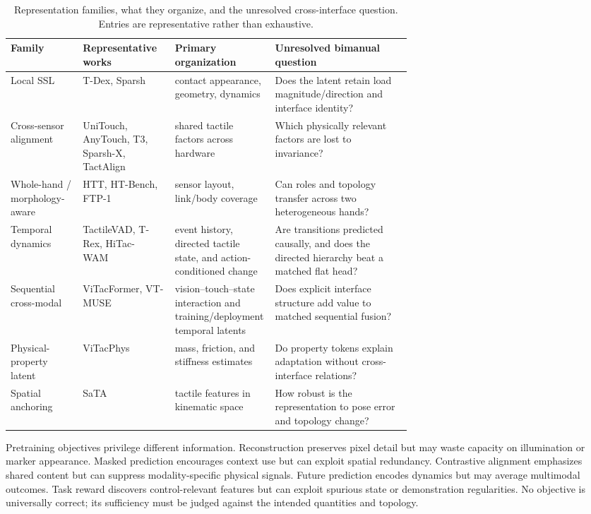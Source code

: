 \begin{table}[t]
\centering
\caption{Representation families, what they organize, and the unresolved
cross-interface question. Entries are representative rather than exhaustive.}
\label{tab:representation_families}
\begin{tabularx}{\linewidth}{P{0.18\linewidth} P{0.23\linewidth} P{0.25\linewidth} Y}
\toprule
\textbf{Family} & \textbf{Representative works} & \textbf{Primary organization} & \textbf{Unresolved bimanual question} \\
\midrule
Local SSL & T-Dex, Sparsh~\cite{guzey2023tdex,higuera2025sparsh} & contact appearance, geometry, dynamics & Does the latent retain load magnitude/direction and interface identity? \\
Cross-sensor alignment & UniTouch, AnyTouch, T3, Sparsh-X, TactAlign~\cite{yang2024unitouch,feng2025anytouch,zhao2024t3,higuera2025sparshx,tactalign2026} & shared tactile factors across hardware & Which physically relevant factors are lost to invariance? \\
Whole-hand / morphology-aware & HTT, HT-Bench, FTP-1~\cite{bi2026htt,huang2026htbench,yuan2026ftp1} & sensor layout, link/body coverage & Can roles and topology transfer across two heterogeneous hands? \\
Temporal dynamics & TactileVAD, T-Rex, HiTac-WAM~\cite{oller2023tactilevad,niu2026trex,xue2026hitacwam} & event history, directed tactile state, and action-conditioned change & Are transitions predicted causally, and does the directed hierarchy beat a matched flat head? \\
Sequential cross-modal & ViTacFormer, VT-MUSE~\cite{heng2025vitacformer,xu2026vtmuse} & vision--touch--state interaction and training/deployment temporal latents & Does explicit interface structure add value to matched sequential fusion? \\
Physical-property latent & ViTacPhys~\cite{liu2026vitacphys} & mass, friction, and stiffness estimates & Do property tokens explain adaptation without cross-interface relations? \\
Spatial anchoring & SaTA~\cite{huang2025sata} & tactile features in kinematic space & How robust is the representation to pose error and topology change? \\
\bottomrule
\end{tabularx}
\end{table}

Pretraining objectives privilege different information. Reconstruction preserves
pixel detail but may waste capacity on illumination or marker appearance. Masked
prediction encourages context use but can exploit spatial redundancy. Contrastive
alignment emphasizes shared content but can suppress modality-specific physical
signals. Future prediction encodes dynamics but may average multimodal outcomes.
Task reward discovers control-relevant features but can exploit spurious state or
demonstration regularities. No objective is universally correct; its sufficiency
must be judged against the intended quantities and topology.

